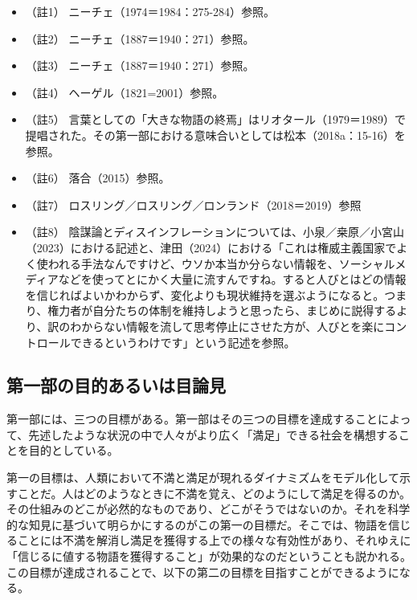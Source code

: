 \begin{itemize}
\tightlist
\item
  （註1） ニーチェ（1974＝1984：275-284）\cite{Nietzsche1}参照。
\item
  （註2） ニーチェ（1887＝1940：271）\cite{Nietzsche2}参照。
\item
  （註3） ニーチェ（1887＝1940：271）\cite{Nietzsche2}参照。
\item
  （註4） ヘーゲル（1821=2001）\cite{Hegel1}参照。
\item
  （註5）
  言葉としての「大きな物語の終焉」はリオタール（1979＝1989）\cite{Lyotard}で提唱された。その第一部における意味合いとしては松本（2018a：15-16）\cite{Matsumoto}を参照。
\item
  （註6） 落合（2015）\cite{Ochiai}参照。
\item
  （註7）
  ロスリング／ロスリング／ロンランド（2018＝2019）\cite{RoslingEtAl}参照
\item
  （註8）
  陰謀論とディスインフレーションについては、小泉／桒原／小宮山（2023）\cite{KoizumiEtAl}における記述と、津田（2024）\cite{Tsuda}における「これは権威主義国家でよく使われる手法なんですけど、ウソか本当か分らない情報を、ソーシャルメディアなどを使ってとにかく大量に流すんですね。すると人びとはどの情報を信じればよいかわからず、変化よりも現状維持を選ぶようになると。つまり、権力者が自分たちの体制を維持しようと思ったら、まじめに説得するより、訳のわからない情報を流して思考停止にさせた方が、人びとを楽にコントロールできるというわけです」という記述を参照。
\end{itemize}

\subsection{第一部の目的あるいは目論見}\label{ux7b2cux4e00ux90e8ux306eux76eeux7684ux3042ux308bux3044ux306fux76eeux8ad6ux898b}

第一部には、三つの目標がある。第一部はその三つの目標を達成することによって、先述したような状況の中で人々がより広く「満足」できる社会を構想することを目的としている。

第一の目標は、人類において不満と満足が現れるダイナミズムをモデル化して示すことだ。人はどのようなときに不満を覚え、どのようにして満足を得るのか。その仕組みのどこが必然的なものであり、どこがそうではないのか。それを科学的な知見に基づいて明らかにするのがこの第一の目標だ。そこでは、物語を信じることには不満を解消し満足を獲得する上での様々な有効性があり、それゆえに「信じるに値する物語を獲得すること」が効果的なのだということも説かれる。この目標が達成されることで、以下の第二の目標を目指すことができるようになる。

